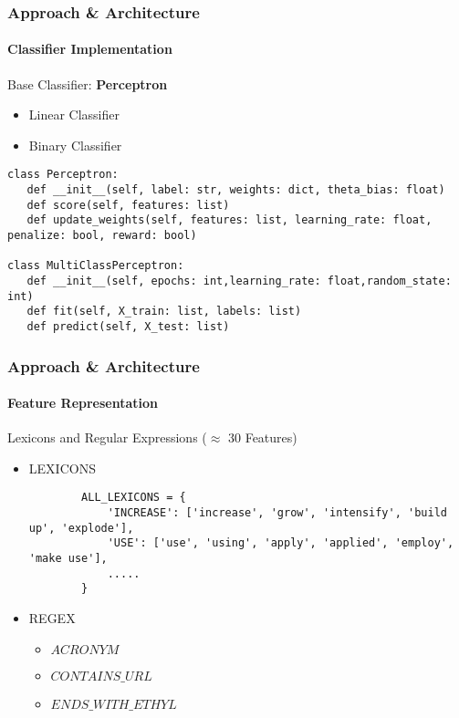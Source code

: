 \documentclass[
  xcolor={svgnames},
  hyperref={colorlinks,citecolor=DeepPink4,linkcolor=DarkRed,urlcolor=DarkBlue}
  ]{beamer}
\begin{document}
\begin{frame}[fragile]
\frametitle{Approach \& Architecture}
\framesubtitle{Classifier Implementation}

Base Classifier: {\bf {\color{red} Perceptron}}
\begin{itemize}
	\item Linear Classifier
	\item Binary Classifier
\end{itemize}
\bigskip

\begin{verbatim}
class Perceptron:
   def __init__(self, label: str, weights: dict, theta_bias: float)
   def score(self, features: list)
   def update_weights(self, features: list, learning_rate: float, penalize: bool, reward: bool)

class MultiClassPerceptron:
   def __init__(self, epochs: int,learning_rate: float,random_state: int)
   def fit(self, X_train: list, labels: list)
   def predict(self, X_test: list)

\end{verbatim}

\end{frame}



\begin{frame}[fragile]
\frametitle{Approach \& Architecture}
\framesubtitle{Feature Representation}

Lexicons and Regular Expressions ($\approx$ 30 Features)
\bigskip

\begin{itemize}
	\item LEXICONS
		\begin{verbatim}
		ALL_LEXICONS = {
		    'INCREASE': ['increase', 'grow', 'intensify', 'build up', 'explode'],
		    'USE': ['use', 'using', 'apply', 'applied', 'employ', 'make use'],
		    .....
		}
		\end{verbatim}
	\item REGEX
		\begin{itemize}
		    \item $ACRONYM$
		    \item $CONTAINS\_URL$
		    \item $ENDS\_WITH\_ETHYL$
		\end{itemize}
\end{itemize}



\end{frame}
\end{document}
